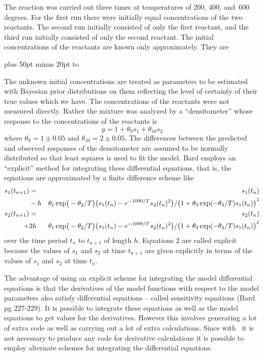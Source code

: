 \documentclass[12pt]{book}
\begin{document}
The reaction was carried out three times at temperatures of 200, 400,
and~600 degrees. For the first run there were initially equal concentrations
of the two reactants. The second run initially consisted
of only the first reactant, and
the third run initially consisted of only the second 
reactant. The initial concentrations of
the reactants are known only approximately. They  are

\htmlbegintex
{ \tabskip=30pt plus 50pt minus 20pt
\halign to }
\htmlendtex

\noindent The unknown initial concentrations are treated as parameters to be
estimated with Bayesian prior distributions on them reflecting the
level of certainty of their true values which we have. 
The concentrations of the reactants were not measured 
directly. Rather the mixture was analyzed by a ``densitometer''
whose response to the concentrations of the reactants is
$$y=1+\theta_9s_1+\theta_{10}s_2$$
where $\theta_9=1\pm0.05$ and $\theta_{10}=2\pm0.05$. The differences 
between the predicted and 
observed responses of the densitometer are assumed to be normally distributed
so that least squares is used to fit the model. 
Bard employs an ``explicit'' method for integrating these differential 
equations, that is, the equations are approximated by a finite difference 
scheme like
 \begin{eqnarray}
s_1(t_{n+1})&=&s_1(t_n)\cr
    &-h&\theta_1{\,\hbox{\rm exp}}\big(-\theta_2/T\big)\big(s_1(t_n)-e^{-1000/T}s_2(t_n)^2\big)/ \big(1+\theta_3{\,\hbox{\rm exp}}(-\theta_4/T)s_1(t_n)\big)^2\cr
           s_2(t_{n+1})&=&s_2(t_n)\cr
    +&2h&\theta_1{\,\hbox{\rm exp}}\big(-\theta_2/T\big)\big(s_1(t_n)-e^{-1000/T}s_2(t_n)^2\big)/ \big(1+\theta_3{\,\hbox{\rm exp}}(-\theta_4/T)s_1(t_n)\big)^2 \cr \label{chp1:xx3}
 \end{eqnarray}
over the time period $t_n$ to $t_{n+1}$ of length $h$.
Equations 2 are called explicit because the values of $s_1$
and $s_2$ at time $t_{n+1}$ are given explicitly in terms
of the values of $s_1$ and $s_2$ at time $t_n$.

The advantage of using an explicit scheme for integrating the 
model differential equations is that the derivatives of the
model functions with respect to the model parameters also satisfy
differential equations -- called sensitivity equations
(Bard pg 227-229).
It is possible to integrate these equations as well as the model equations
to get values for the derivatives. However this involves generating
a lot of extra code as well as carrying out a lot of
extra calculations. Since with \ADM\ it is not necessary to
produce any code for derivative calculations  it is possible
to employ alternate schemes for integrating the differential
equations. 
\end{document}
